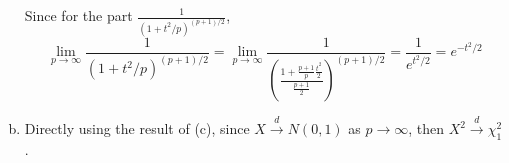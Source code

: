 \documentclass[letterpaper]{article}
\newcommand{\convd}{\stackrel{d}{\to}}
\begin{document}
\begin{enumerate}[(a)]
Since for the part $\frac{1}{(1+t^2/p)^{(p+1)/2}}$,
\[
\lim_{p \to \infty} \frac{1}{(1+t^2/p)^{(p+1)/2}} = \lim_{p \to \infty} \frac{1}{\left(\frac{1+\frac{p+1}{p} \frac{t^2}{2}}{\frac{p+1}{2}}\right)^{(p+1)/2}} = \frac{1}{e^{t^2/2}} = e^{-t^2/2}
\]
\item
Directly using the result of (c), since $X \convd N(0, 1)$ as $p \to \infty$, then $X^2 \convd \chi^2_1$.
\end{enumerate}
\end{document}
